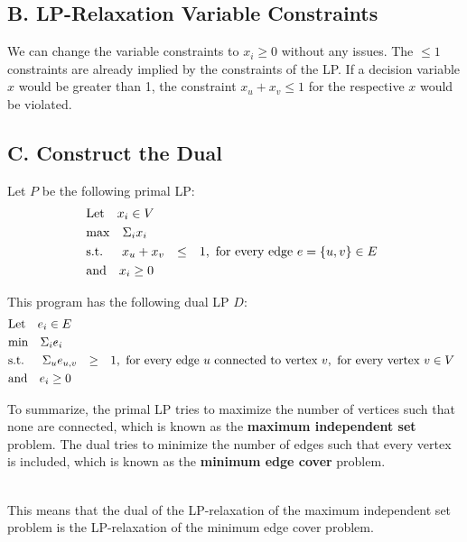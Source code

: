 \documentclass[12pt]{article}
\begin{document}
\subsection{B. LP-Relaxation Variable Constraints}
We can change the variable constraints to $x_i \geq 0$ without any issues.
The $\leq 1$ constraints are already implied by the constraints of the LP.
If a decision variable $x$ would be greater than 1, the constraint $x_u + x_v \leq 1$ for the respective $x$ would be violated.

\newpage
\subsection{C. Construct the Dual}
Let $P$ be the following primal LP:
\begin{align*}
  &\mathrm{Let} \quad x_i \in V \\
  &\mathrm{max} \quad \Sigma_{i} x_i \\
  &\mathrm{s.t.} \quad 
  \begin{array}[t]{r c r}
      x_u + x_v & \leq & 1, \text{ for every edge } e = \{u, v\} \in E 
  \end{array}\\
  &\mathrm{and} \quad x_i \geq 0
\end{align*}

\noindent
This program has the following dual LP $D$:
\begin{align*}
  &\mathrm{Let} \quad e_i \in E \\
  &\mathrm{min} \quad \Sigma_{i} e_i \\
  &\mathrm{s.t.} \quad 
  \begin{array}[t]{r c r}
      \Sigma_{u} e_{u, v} & \geq & 1, \text{ for every edge } u \text{ connected to vertex } v, \text{ for every vertex } v \in V
  \end{array}\\
  &\mathrm{and} \quad e_i \geq 0
\end{align*}

\noindent
To summarize, the primal LP tries to maximize the number of vertices such that none are connected, which is known as the \textbf{maximum independent set} problem.
The dual tries to minimize the number of edges such that every vertex is included, which is known as the \textbf{minimum edge cover} problem.

\noindent
\\
This means that the dual of the LP-relaxation of the maximum independent set problem is the LP-relaxation of the minimum edge cover problem.
\end{document}
